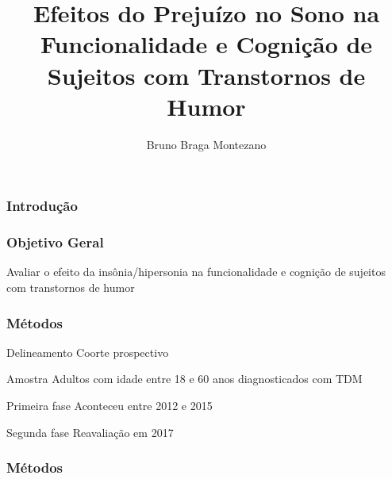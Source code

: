\documentclass{beamer}
\title{Efeitos do Prejuízo no Sono na Funcionalidade e Cognição de Sujeitos com Transtornos de Humor}
\author[Bruno Montezano]{Bruno Braga Montezano}
\institute{Universidade Católica de Pelotas}
\begin{document}
\begin{frame}

\maketitle

\end{frame}

\begin{frame}
\frametitle{Introdução}



\end{frame}

\begin{frame}



\end{frame}

\begin{frame}



\end{frame}

\begin{frame}
    \frametitle{Objetivo Geral}

    \centering
    \Large
    Avaliar o efeito da insônia/hipersonia na funcionalidade e
    cognição de sujeitos com transtornos de humor

\end{frame}

\begin{frame}
\frametitle{Métodos}

    \begin{block}{Delineamento}
        Coorte prospectivo
    \end{block}

    \begin{block}{Amostra}
        Adultos com idade entre 18 e 60 anos diagnosticados com TDM
    \end{block}

    \begin{block}{Primeira fase}
        Aconteceu entre 2012 e 2015
    \end{block}

    \begin{block}{Segunda fase}
        Reavaliação em 2017
    \end{block}

\end{frame}

\begin{frame}
\frametitle{Métodos}


    \centering

\end{frame}
\end{document}
